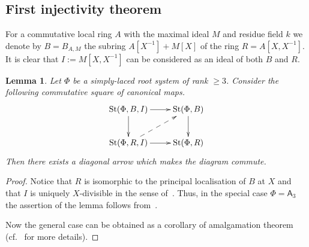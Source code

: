 \documentclass[oneside, 10pt]{amsart}
\newtheorem{lemma}{Lemma}
\theoremstyle{remark}
\theoremstyle{definition}
\DeclareMathOperator{\St}{St}
\newcommand{\rA}{\mathsf{A}}
\numberwithin{equation}{section}
\begin{document}
\subsection{First injectivity theorem}
For a commutative local ring $A$ with the maximal ideal $M$ and residue field $k$
we denote by $B = B_{A, M}$ the subring $A[X^{-1}] + M[X]$ of the ring $R = A[X, X^{-1}]$.
It is clear that $I := M[X, X^{-1}]$ can be considered as an ideal of both $B$ and $R$.
\begin{lemma}\label{lem:lemma32} Let $\Phi$ be a simply-laced root system of rank $\geq 3$.
Consider the following commutative square of canonical maps.
\[ \xymatrix{
    \St(\Phi, B, I) \ar[r] \ar[d] & \St(\Phi, B) \ar[d] \\
    \St(\Phi, R, I) \ar[r] \ar@{-->}[ur] & \St(\Phi, R)
   } \]
Then there exists a diagonal arrow which makes the diagram commute.   
\end{lemma} 
\begin{proof}
 Notice that $R$ is isomorphic to the principal localisation of $B$ at $X$
  and that $I$ is uniquely $X$-divisible in the sense of~\cite[\S~4]{LS17}.
 Thus, in the special case $\Phi = \rA_3$ the assertion of the lemma follows from~\cite[Theorem~3]{LS17}.
 
 Now the general case can be obtained as a corollary of amalgamation theorem~\cite[Theorem~9]{S15}
  (cf.~\cite[\S~4]{LS17} for more details).
\end{proof}
\end{document}
